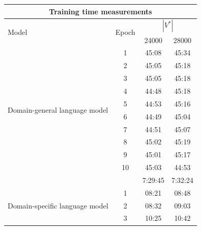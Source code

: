 \begin{table}[ht]
\centering
\begin{tabular}{ lccc }
\toprule
\multicolumn{4}{c}{Training time measurements} \\ \midrule
\multirow{2}{*}{Model}                           & \multirow{2}{*}{Epoch} & \multicolumn{2}{c}{$|V^*|$} \\
                                                 &                        & 24000            & 28000            \\ \midrule
\multirow{10}{*}{Domain-general language model}  & 1                      & 45:08            & 45:34            \\
                                                 & 2                      & 45:05            & 45:18            \\
                                                 & 3                      & 45:05            & 45:18            \\
                                                 & 4                      & 44:48            & 45:18            \\
                                                 & 5                      & 44:53            & 45:16            \\
                                                 & 6                      & 44:49            & 45:04            \\
                                                 & 7                      & 44:51            & 45:07            \\
                                                 & 8                      & 45:02            & 45:19            \\
                                                 & 9                      & 45:01            & 45:17            \\
                                                 & 10                     & 45:03            & 44:53            \\ \midrule
& & 7:29:45 & 7:32:24\\ \midrule
\multirow{10}{*}{Domain-specific language model} & 1                      & 08:21            & 08:48            \\
                                                 & 2                      & 08:32            & 09:03            \\
                                                 & 3                      & 10:25            & 10:42            \\

\end{tabular}
\end{table}
